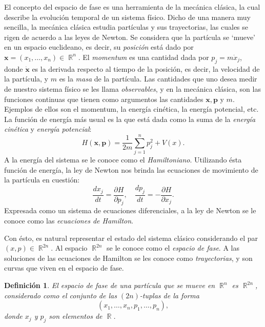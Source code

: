 \documentclass[a4paper]{report}
\DeclareMathOperator{\R}{\mathbb{R}}
\newtheorem{definition}{Definición}
\begin{document}
  El concepto del espacio de fase es una herramienta de la
  mecánica clásica, la cual describe la evolución temporal
  de un sistema físico. Dicho de una manera muy sencilla, la
  mecánica clásica estudia partículas y sus trayectorias,
  las cuales se rigen de acuerdo a las leyes de Newton.  Se
  considera que la partícula se `mueve' en un espacio
  euclideano, es decir, su \textit{posición} está dado por
  $\bm{x} = (x_1,\ldots,x_n) \in \R^{n}$. El
  \textit{momentum} es una cantidad dada por $p_j = m \dot
  x_j$, donde $\bm{\dot x}$ es la derivada respecto al
  tiempo de la posición, es decir, la velocidad de la
  partícula, y $m$ es la \textit{masa} de la partícula. Las
  cantidades que uno desea medir de nuestro sistema físico
  se les llama \textit{observables}, y en la mecánica
  clásica, son las funciones continuas que tienen como
  argumentos las cantidades $\bm{x},\bm{p}$ y $m$. Ejemplos
  de ellos son el momentum, la energía cinética, la energía
  potencial, etc. La función de energía más usual es la que
  está dada como la suma de la \textit{energía cinética} y
  \textit{energía potencial}:
  \begin{equation}
    H(\bm{x},\bm{p})
    = \frac{1}{2m} \sum_{j=1}^{n} p_j^2 + V(x).
  \end{equation}
  A la energía del sistema se le conoce como el
  \textit{Hamiltoniano}.  Utilizando ésta función de
  energía, la ley de Newton nos brinda las ecuaciones de
  movimiento de la partícula en cuestión:
  \begin{equation}
    \frac{dx_j}{dt}
    = \frac{\partial H}{\partial p_j},
    \quad
    \frac{dp_j}{dt}
    = -\frac{\partial H}{\partial x_j}.
  \end{equation}
  Expresada como un sistema de ecuaciones diferenciales, a
  la ley de Newton se le conoce como las \textit{ecuaciones
  de Hamilton}.  

  Con ésto, es natural representar el estado del sistema
  clásico considerando el par $(x,p) \in \R^{2n}$. Al
  espacio $\R^{2n}$ se le conoce como el \textit{espacio de
  fase}. A las soluciones de las ecuaciones de Hamilton se
  les conoce como \textit{trayectorias}, y son curvas que
  viven en el espacio de fase.
  \begin{definition}
    El espacio de fase de una partícula que se mueve en
    $\R^{n}$ es $\R^{2n}$, considerado como el conjunto de
    las $(2n)$-tuplas de la forma
    \[
      \left(
        x_1, \ldots, x_n, p_1, \ldots, p_n
      \right),
    \] 
    donde $x_j$ y $p_j$ son elementos de $\R$.
  \end{definition}
\end{document}
